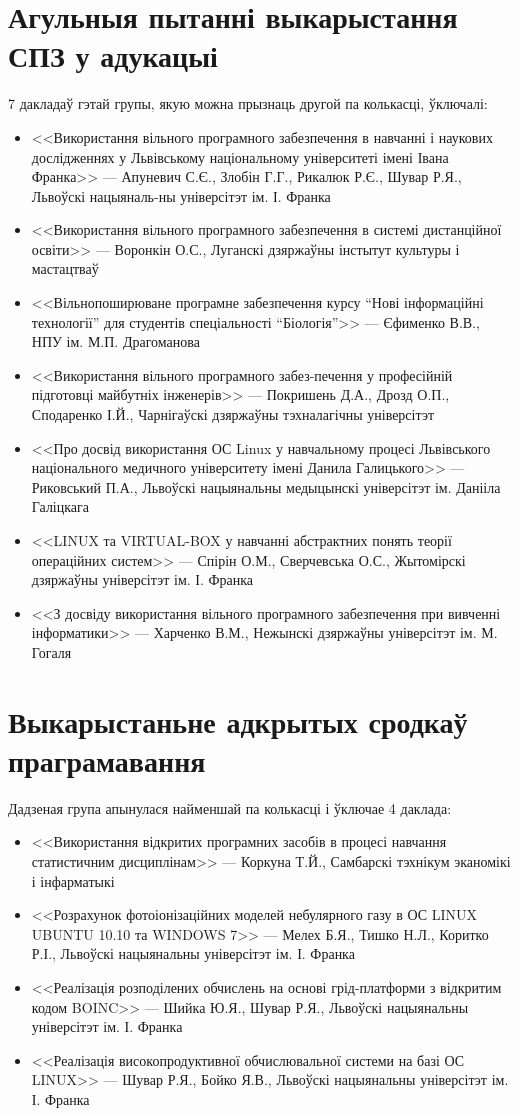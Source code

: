 \documentclass[10pt, a5paper]{article}
\begin{document}
\section{Агульныя пытанні выкарыстання СПЗ у адукацыі}
7 дакладаў гэтай групы, якую можна прызнаць другой па колькасці, ўключалі:
\begin{itemize}
\item <<Використання вільного програмного забезпечення в навчанні і наукових дослідженнях у Львівському національному університеті імені Івана Франка>> --- Апуневич С.Є., Злобін Г.Г., Рикалюк Р.Є., Шувар Р.Я., Львоўскі нацыяналь-ны універсітэт ім. І. Франка
\item <<Використання вільного програмного забезпечення в системі дистанційної освіти>> --- Воронкін О.С., Луганскі дзяржаўны інстытут культуры і мастацтваў
\item <<Вільнопоширюване програмне забезпечення курсу “Нові інформаційні технології” для студентів спеціальності “Біологія”>> --- Єфименко В.В., НПУ ім. М.П. Драгоманова
\item <<Використання вільного програмного забез-печення у професійній підготовці майбутніх інженерів>> --- Покришень Д.А., Дрозд О.П., Сподаренко І.Й., Чарнігаўскі дзяржаўны тэхналагічны універсітэт
\item  <<Про досвід використання ОС Linux у навчальному процесі Львівського національного медичного університету імені Данила Галицького>> --- Риковський П.А., Львоўскі нацыянальны медыцынскі універсітэт ім. Данііла Галіцкага
\item  <<LINUX  та VIRTUAL-BOX у навчанні абстрактних понять теорії операційних систем>> --- Спірін О.М., Сверчевська О.С., Жытомірскі дзяржаўны універсітэт ім. І. Франка
\item  <<З досвіду використання вільного програмного забезпечення при вивченні інформатики>> --- Харченко В.М., Нежынскі дзяржаўны універсітэт ім. М. Гогаля
\end{itemize}

\section{Выкарыстаньне адкрытых сродкаў праграмавання}
Дадзеная група апынулася найменшай па колькасці і ўключае 4 даклада:
\begin{itemize}
\item <<Використання відкритих програмних засобів в процесі навчання статистичним дисциплінам>> --- Коркуна Т.Й., Самбарскі тэхнікум эканомікі і інфарматыкі
\item <<Розрахунок фотоіонізаційних моделей небулярного газу в ОС LINUX UBUNTU 10.10 та WINDOWS 7>> --- Мелех Б.Я., Тишко Н.Л., Коритко Р.І., Львоўскі нацыянальны  універсітэт ім. І. Франка
\item <<Реалізація розподілених обчислень на основі грід-платформи з відкритим кодом BOINC>> --- Шийка Ю.Я., Шувар Р.Я., Львоўскі нацыянальны  універсітэт ім. І. Франка
\item <<Реалізація високопродуктивної обчислювальної системи на базі ОС  LINUX>> --- Шувар Р.Я., Бойко Я.В., Львоўскі нацыянальны  універсітэт ім. І. Франка
\end{itemize}
\end{document}
